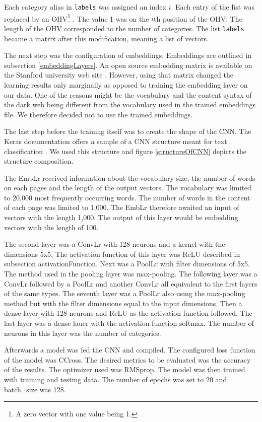 Each category alias in \texttt{labels} was assigned an index $i$. Each entry of the list was replaced by an OHV\footnote{A zero vector with one value being 1.} . The value 1 was on the $i$th position of the OHV. The length of the OHV corresponded to the number of categories. The list \texttt{labels} became a matrix after this modification, meaning a list of vectors.

The next step was the configuration of embeddings. Embeddings are outlined in subsection \ref{embeddingLayers}. An open source embedding matrix is available on the Stanford university web site \cite{embeddings}. However, using that matrix changed the learning results only marginally as opposed to training the embedding layer on our data. One of the reasons might be the vocabulary and the content syntax of the dark web being different from the vocabulary used in the trained embeddings file. We therefore decided not to use the trained embeddings.

The last step before the training itself was to create the shape of the CNN. The Keras documentation offers a sample of a CNN structure meant for text classification \cite{kerasCNNStructure}. We used this structure and figure \ref{structureOfCNN} depicts the structure composition. 

The EmbLr received information about the vocabulary size, the number of words on each pages and the length of the output vectors. The vocabulary was limited to 20,000 most frequently occurring words. The number of words in the content of each page was limited to 1,000. The EmbLr therefore awaited an input of vectors with the length 1,000. The output of this layer would be embedding vectors with the length of 100. 

The second layer was a ConvLr with 128 neurons and a kernel with the dimensions 5x5. The activation function of this layer was ReLU described in subsection {activationFunction}. Next was a PoolLr with filter dimensions of 5x5. The method used in the pooling layer was max-pooling. The following layer was a ConvLr followed by a PoolLr and another ConvLr all equivalent to the first layers of the same types. The seventh layer was a PoolLr also using the max-pooling method but with the filter dimensions equal to the input dimensions. Then a dense layer with 128 neurons and ReLU as the activation function followed. The last layer was a dense lauer with the activation function softmax. The number of neurons in this layer was the number of categories.

Afterwards a model was fed the CNN and compiled. The configured loss function of the model was CCross. The desired metrics to be evaluated was the accuracy of the results. The optimizer used  was RMSprop. The model was then trained with training and testing data. The number of epochs was set to 20 and batch\_size was 128.

